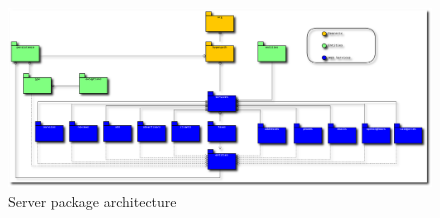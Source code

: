 \pagebreak
  \begin{figure}[p]
    \begin{center}
      \includegraphics[scale=0.38,
      angle=90]{Figures/HyperPath_server_packages.eps}
     \end{center}
     \caption{Server package architecture}
     \label{Server package architecture}
  \end{figure}
